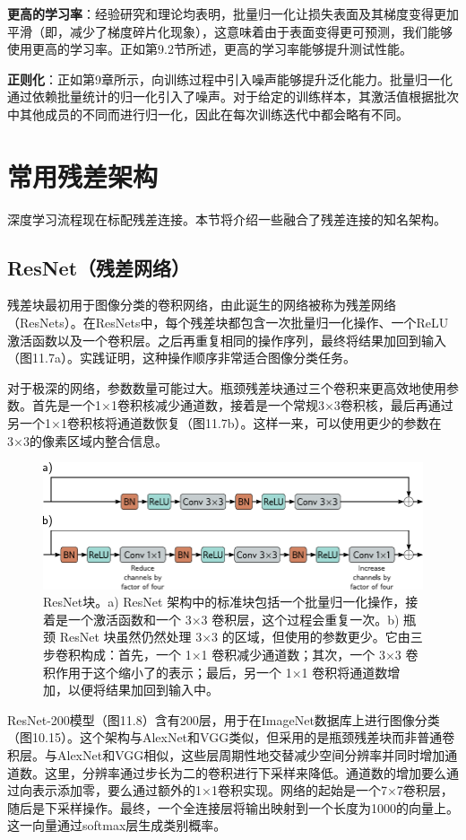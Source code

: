 \documentclass[lang=cn,newtx,10pt,scheme=chinese]{elegantbook}
\begin{document}
\textbf{更高的学习率}：经验研究和理论均表明，批量归一化让损失表面及其梯度变得更加平滑（即，减少了梯度碎片化现象），这意味着由于表面变得更可预测，我们能够使用更高的学习率。正如第9.2节所述，更高的学习率能够提升测试性能。

\textbf{正则化}：正如第9章所示，向训练过程中引入噪声能够提升泛化能力。批量归一化通过依赖批量统计的归一化引入了噪声。对于给定的训练样本，其激活值根据批次中其他成员的不同而进行归一化，因此在每次训练迭代中都会略有不同。

\section{常用残差架构}
深度学习流程现在标配残差连接。本节将介绍一些融合了残差连接的知名架构。

\subsection{ResNet（残差网络）}
残差块最初用于图像分类的卷积网络，由此诞生的网络被称为残差网络（ResNets）。在ResNets中，每个残差块都包含一次批量归一化操作、一个ReLU激活函数以及一个卷积层。之后再重复相同的操作序列，最终将结果加回到输入（图11.7a）。实践证明，这种操作顺序非常适合图像分类任务。

对于极深的网络，参数数量可能过大。瓶颈残差块通过三个卷积来更高效地使用参数。首先是一个1×1卷积核减少通道数，接着是一个常规3×3卷积核，最后再通过另一个1×1卷积核将通道数恢复（图11.7b）。这样一来，可以使用更少的参数在3×3的像素区域内整合信息。

\begin{figure}[ht!]
\centering
\includegraphics[width=0.7\linewidth]{PDFFigures/UDLChap11PDF/ResidualResNet1.pdf}
\caption{ResNet块。a) ResNet 架构中的标准块包括一个批量归一化操作，接着是一个激活函数和一个 3×3 卷积层，这个过程会重复一次。b) 瓶颈 ResNet 块虽然仍然处理 3×3 的区域，但使用的参数更少。它由三步卷积构成：首先，一个 1×1 卷积减少通道数；其次，一个 3×3 卷积作用于这个缩小了的表示；最后，另一个 1×1 卷积将通道数增加，以便将结果加回到输入中。}
\end{figure}


ResNet-200模型（图11.8）含有200层，用于在ImageNet数据库上进行图像分类（图10.15）。这个架构与AlexNet和VGG类似，但采用的是瓶颈残差块而非普通卷积层。与AlexNet和VGG相似，这些层周期性地交替减少空间分辨率并同时增加通道数。这里，分辨率通过步长为二的卷积进行下采样来降低。通道数的增加要么通过向表示添加零，要么通过额外的1×1卷积实现。网络的起始是一个7×7卷积层，随后是下采样操作。最终，一个全连接层将输出映射到一个长度为1000的向量上。这一向量通过softmax层生成类别概率。
\end{document}
